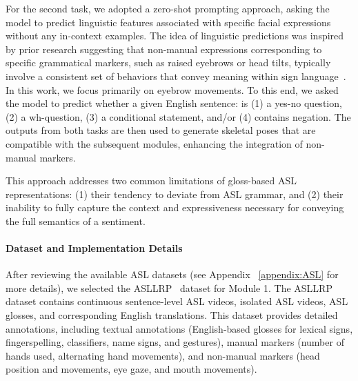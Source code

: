 For the second task, we adopted a zero-shot prompting approach, asking the model to predict linguistic features associated with specific facial expressions without any in-context examples. The idea of linguistic predictions was inspired by prior research suggesting that non-manual expressions corresponding to specific grammatical markers, such as raised eyebrows or head tilts, typically involve a consistent set of behaviors that convey meaning within sign language~\cite{neidle2002signstream,baker1983microanalysis}. In this work, we focus primarily on eyebrow movements. To this end, we asked the model to predict whether a given English sentence: is (1) a yes-no question, (2) a wh-question, (3) a conditional statement, and/or (4) contains negation. The outputs from both tasks are then used to generate skeletal poses that are compatible with the subsequent modules, enhancing the integration of non-manual markers. 

This approach addresses two common limitations of gloss-based ASL representations: (1) their tendency to deviate from ASL grammar, and (2) their inability to fully capture the context and expressiveness necessary for conveying the full semantics of a sentiment. 

\paragraph{Dataset and Implementation Details} After reviewing the available ASL datasets (see Appendix ~\ref{appendix:ASL} for more details), we selected the ASLLRP~\cite{neidle_asl_2022} dataset for Module 1. The ASLLRP dataset contains continuous sentence-level ASL videos, isolated ASL videos, ASL glosses, and corresponding English translations. This dataset provides detailed annotations, including textual annotations (\eg English-based glosses for lexical signs, fingerspelling, classifiers, name signs, and gestures), manual markers (\eg number of hands used, alternating hand movements), and non-manual markers (\eg head position and movements, eye gaze, and mouth movements). 

